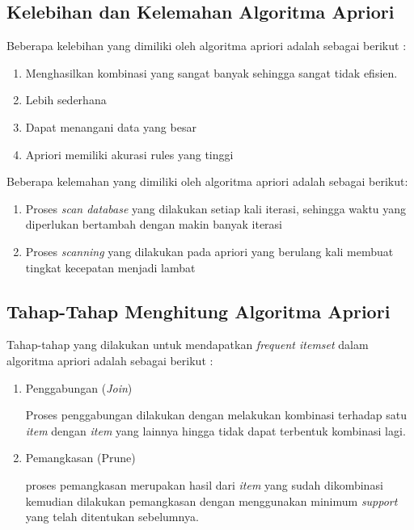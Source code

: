 \subsection{Kelebihan dan Kelemahan Algoritma Apriori}
\par Beberapa kelebihan yang dimiliki oleh algoritma apriori adalah sebagai berikut \cite{fauzy2016penerapan}:
 \begin{enumerate}
\item Menghasilkan kombinasi yang sangat banyak sehingga sangat tidak efisien. 
\item Lebih sederhana
\item Dapat menangani data yang besar
\item Apriori memiliki akurasi rules yang tinggi
\end{enumerate}

\par Beberapa kelemahan yang dimiliki oleh algoritma apriori adalah sebagai berikut:
 \begin{enumerate}
\item Proses \textit{scan database} yang dilakukan setiap kali iterasi, sehingga waktu yang diperlukan bertambah dengan makin banyak iterasi
\item Proses \textit{scanning} yang
dilakukan pada apriori yang berulang kali membuat tingkat kecepatan menjadi lambat

\end{enumerate}

\subsection{Tahap-Tahap Menghitung Algoritma Apriori}
Tahap-tahap yang dilakukan untuk mendapatkan \textit{frequent itemset} dalam algoritma apriori adalah sebagai berikut \cite{triyanto2014association}:
 \begin{enumerate}
\item Penggabungan (\textit{Join})
\par Proses penggabungan dilakukan dengan melakukan kombinasi terhadap satu \textit{item} dengan \textit{item} yang lainnya hingga tidak dapat terbentuk kombinasi lagi.
\item Pemangkasan (Prune)
\par proses pemangkasan merupakan hasil dari \textit{item} yang sudah dikombinasi kemudian dilakukan pemangkasan dengan menggunakan minimum \textit{support} yang telah ditentukan sebelumnya. 
\end{enumerate}

